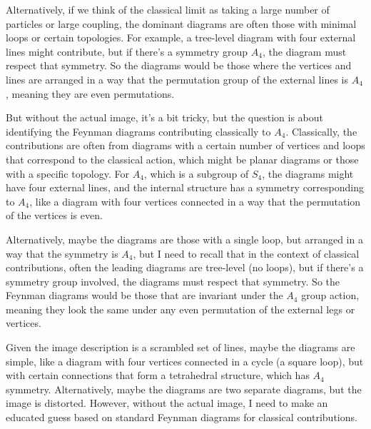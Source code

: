 Alternatively, if we think of the classical limit as taking a large number of particles or large coupling, the dominant diagrams are often those with minimal loops or certain topologies. For example, a tree-level diagram with four external lines might contribute, but if there's a symmetry group \( A_4 \), the diagram must respect that symmetry. So the diagrams would be those where the vertices and lines are arranged in a way that the permutation group of the external lines is \( A_4 \), meaning they are even permutations.

But without the actual image, it's a bit tricky, but the question is about identifying the Feynman diagrams contributing classically to \( A_4 \). Classically, the contributions are often from diagrams with a certain number of vertices and loops that correspond to the classical action, which might be planar diagrams or those with a specific topology. For \( A_4 \), which is a subgroup of \( S_4 \), the diagrams might have four external lines, and the internal structure has a symmetry corresponding to \( A_4 \), like a diagram with four vertices connected in a way that the permutation of the vertices is even.

Alternatively, maybe the diagrams are those with a single loop, but arranged in a way that the symmetry is \( A_4 \), but I need to recall that in the context of classical contributions, often the leading diagrams are tree-level (no loops), but if there's a symmetry group involved, the diagrams must respect that symmetry. So the Feynman diagrams would be those that are invariant under the \( A_4 \) group action, meaning they look the same under any even permutation of the external legs or vertices.

Given the image description is a scrambled set of lines, maybe the diagrams are simple, like a diagram with four vertices connected in a cycle (a square loop), but with certain connections that form a tetrahedral structure, which has \( A_4 \) symmetry. Alternatively, maybe the diagrams are two separate diagrams, but the image is distorted. However, without the actual image, I need to make an educated guess based on standard Feynman diagrams for classical contributions.

